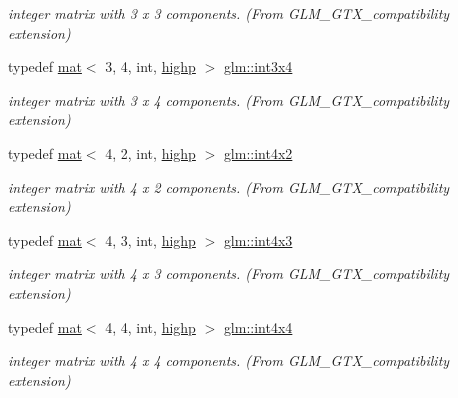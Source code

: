 \begin{DoxyCompactItemize}
\begin{DoxyCompactList}\small\item\em integer matrix with 3 x 3 components. (From G\+L\+M\+\_\+\+G\+T\+X\+\_\+compatibility extension) \end{DoxyCompactList}\item 
typedef \mbox{\hyperlink{structglm_1_1mat}{mat}}$<$ 3, 4, int, \mbox{\hyperlink{namespaceglm_a36ed105b07c7746804d7fdc7cc90ff25ac6f7eab42eacbb10d59a58e95e362074}{highp}} $>$ \mbox{\hyperlink{group__gtx__compatibility_gaaf72af875fd64f43606aa083d2374195}{glm\+::int3x4}}
\begin{DoxyCompactList}\small\item\em integer matrix with 3 x 4 components. (From G\+L\+M\+\_\+\+G\+T\+X\+\_\+compatibility extension) \end{DoxyCompactList}\item 
typedef \mbox{\hyperlink{structglm_1_1mat}{mat}}$<$ 4, 2, int, \mbox{\hyperlink{namespaceglm_a36ed105b07c7746804d7fdc7cc90ff25ac6f7eab42eacbb10d59a58e95e362074}{highp}} $>$ \mbox{\hyperlink{group__gtx__compatibility_ga217e382844361bca6a376e72efa4b360}{glm\+::int4x2}}
\begin{DoxyCompactList}\small\item\em integer matrix with 4 x 2 components. (From G\+L\+M\+\_\+\+G\+T\+X\+\_\+compatibility extension) \end{DoxyCompactList}\item 
typedef \mbox{\hyperlink{structglm_1_1mat}{mat}}$<$ 4, 3, int, \mbox{\hyperlink{namespaceglm_a36ed105b07c7746804d7fdc7cc90ff25ac6f7eab42eacbb10d59a58e95e362074}{highp}} $>$ \mbox{\hyperlink{group__gtx__compatibility_gadda7ab2670c41cbe997641db23ace3d2}{glm\+::int4x3}}
\begin{DoxyCompactList}\small\item\em integer matrix with 4 x 3 components. (From G\+L\+M\+\_\+\+G\+T\+X\+\_\+compatibility extension) \end{DoxyCompactList}\item 
typedef \mbox{\hyperlink{structglm_1_1mat}{mat}}$<$ 4, 4, int, \mbox{\hyperlink{namespaceglm_a36ed105b07c7746804d7fdc7cc90ff25ac6f7eab42eacbb10d59a58e95e362074}{highp}} $>$ \mbox{\hyperlink{group__gtx__compatibility_ga4f4e5fb81339df0489d802fb9d574fd7}{glm\+::int4x4}}
\begin{DoxyCompactList}\small\item\em integer matrix with 4 x 4 components. (From G\+L\+M\+\_\+\+G\+T\+X\+\_\+compatibility extension) \end{DoxyCompactList}\item 

\end{DoxyCompactItemize}
